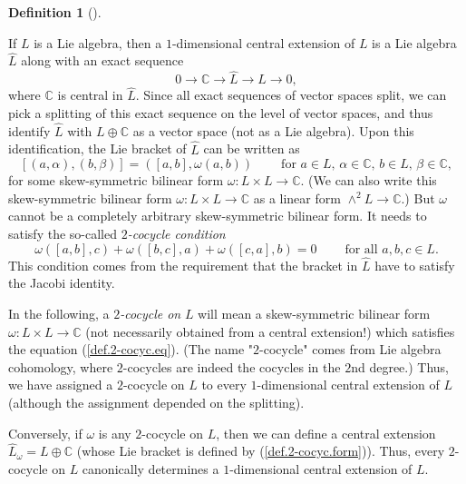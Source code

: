 \documentclass
[numbers=enddot,12pt,final,onecolumn,german,notitlepage]{scrartcl}%
\theoremstyle{definition}
\newtheorem{defi}[theo]{Definition}
\newenvironment{definition}[1][]
{\begin{defi}[#1]\begin{leftbar}}
{\end{leftbar}\end{defi}}
\begin{document}
\begin{definition}
\label{def.centex}If $L$ is a Lie algebra, then a $1$-dimensional central
extension of $L$ is a Lie algebra $\widehat{L}$ along with an exact sequence%
\begin{equation}
0\rightarrow\mathbb{C}\rightarrow\widehat{L}\rightarrow L\rightarrow0,
\label{def.2-cocyc.es}%
\end{equation}
where $\mathbb{C}$ is central in $\widehat{L}$. Since all exact sequences of
vector spaces split, we can pick a splitting of this exact sequence on the
level of vector spaces, and thus identify $\widehat{L}$ with $L\oplus
\mathbb{C}$ as a vector space (not as a Lie algebra). Upon this
identification, the Lie bracket of $\widehat{L}$ can be written as%
\begin{equation}
\left[  \left(  a,\alpha\right)  ,\left(  b,\beta\right)  \right]  =\left(
\left[  a,b\right]  ,\omega\left(  a,b\right)  \right)
\ \ \ \ \ \ \ \ \ \ \text{for }a\in L\text{, }\alpha\in\mathbb{C}\text{, }b\in
L\text{, }\beta\in\mathbb{C}, \label{def.2-cocyc.form}%
\end{equation}
for some skew-symmetric bilinear form $\omega:L\times L\rightarrow\mathbb{C}$.
(We can also write this skew-symmetric bilinear form $\omega:L\times
L\rightarrow\mathbb{C}$ as a linear form $\wedge^{2}L\rightarrow\mathbb{C}$.)
But $\omega$ cannot be a completely arbitrary skew-symmetric bilinear form. It
needs to satisfy the so-called $2$\textit{-cocycle condition}%
\begin{equation}
\omega\left(  \left[  a,b\right]  ,c\right)  +\omega\left(  \left[
b,c\right]  ,a\right)  +\omega\left(  \left[  c,a\right]  ,b\right)
=0\ \ \ \ \ \ \ \ \ \ \text{for all }a,b,c\in L. \label{def.2-cocyc.eq}%
\end{equation}
This condition comes from the requirement that the bracket in $\widehat{L}$
have to satisfy the Jacobi identity.

In the following, a $2$\textit{-cocycle on }$L$ will mean a skew-symmetric
bilinear form $\omega:L\times L\rightarrow\mathbb{C}$ (not necessarily
obtained from a central extension!) which satisfies the equation
(\ref{def.2-cocyc.eq}). (The name "$2$-cocycle" comes from Lie algebra
cohomology, where $2$-cocycles are indeed the cocycles in the $2$nd degree.)
Thus, we have assigned a $2$-cocycle on $L$ to every $1$-dimensional central
extension of $L$ (although the assignment depended on the splitting).

Conversely, if $\omega$ is any $2$-cocycle on $L$, then we can define a
central extension $\widehat{L}_{\omega}=L\oplus\mathbb{C}$ (whose Lie bracket
is defined by (\ref{def.2-cocyc.form})). Thus, every $2$-cocycle on $L$
canonically determines a $1$-dimensional central extension of $L$.


\end{definition}
\end{document}
